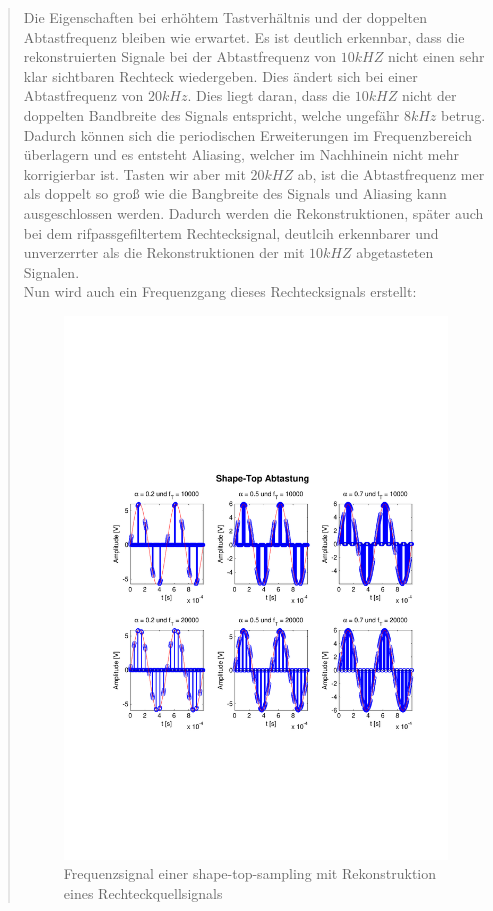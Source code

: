 \begin{quote}
  	    Die Eigenschaften bei erhöhtem Tastverhältnis und der doppelten
  	    Abtastfrequenz bleiben wie erwartet. Es ist deutlich erkennbar, dass
  	    die rekonstruierten Signale bei der Abtastfrequenz von $10 kHZ$ nicht
  	    einen sehr klar sichtbaren Rechteck wiedergeben. Dies ändert sich bei
  	    einer Abtastfrequenz von $20 kHz$. Dies liegt daran, dass die $10 kHZ$
  	    nicht der doppelten Bandbreite des Signals entspricht, welche ungefähr
  	    $8 kHz$ betrug. Dadurch können sich die periodischen Erweiterungen
  	    im Frequenzbereich überlagern und es entsteht Aliasing, welcher im
  	    Nachhinein nicht mehr korrigierbar ist. Tasten wir aber mit $20 kHZ$
  	    ab, ist die Abtastfrequenz mer als doppelt so groß wie die Bangbreite
  	    des Signals und Aliasing kann ausgeschlossen werden. Dadurch werden die
  	    Rekonstruktionen, später auch bei dem rifpassgefiltertem
  	    Rechtecksignal, deutlcih erkennbarer und unverzerrter als die
  	    Rekonstruktionen der mit $10 kHZ$ abgetasteten Signalen.\\
  	    
  	    Nun wird auch ein Frequenzgang dieses Rechtecksignals erstellt:
    	
    	
    	\begin{figure}[H]
    \centering
        \includegraphics[scale=0.7, trim = 0cm 0cm 0cm 0cm,
        clip]{./Bilder/shape-top-zeit_3V}
            \caption{Frequenzsignal einer shape-top-sampling mit Rekonstruktion
            eines Rechteckquellsignals}
  	    \end{figure}
  	    

\end{quote}
